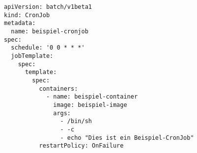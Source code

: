 \begin{verbatim}
apiVersion: batch/v1beta1
kind: CronJob
metadata:
  name: beispiel-cronjob
spec:
  schedule: '0 0 * * *'
  jobTemplate:
    spec:
      template:
        spec:
          containers:
            - name: beispiel-container
              image: beispiel-image
              args:
                - /bin/sh
                - -c
                - echo "Dies ist ein Beispiel-CronJob"
          restartPolicy: OnFailure

\end{verbatim}